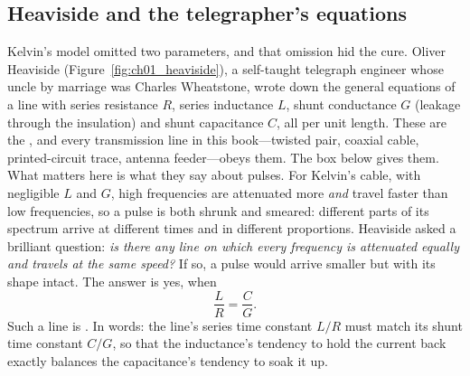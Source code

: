 \subsection{Heaviside and the telegrapher's equations}
\label{sec:ch01:heaviside}


Kelvin's model omitted two parameters, and that omission hid the cure. Oliver Heaviside
(Figure~\ref{fig:ch01_heaviside}), a self-taught telegraph engineer whose uncle by marriage was
Charles Wheatstone, wrote down the general equations of a line with series resistance $R$, series
inductance $L$, shunt conductance $G$ (leakage through the insulation) and shunt capacitance $C$, all
per unit length. These are the , and every transmission line in this
book---twisted pair, coaxial cable, printed-circuit trace, antenna feeder---obeys them.
The box below gives them. What matters here is what they say about pulses. For Kelvin's cable, with
negligible $L$ and $G$, high frequencies are attenuated more \emph{and} travel faster than low
frequencies, so a pulse is both shrunk and smeared: different parts of its spectrum arrive at
different times and in different proportions. Heaviside asked a brilliant question: \emph{is there
any line on which every frequency is attenuated equally and travels at the same speed?} If so, a
pulse would arrive smaller but with its shape intact. The answer is yes, when
\begin{equation}
\frac{L}{R} = \frac{C}{G}.
\label{eq:ch01:distortionless}
\end{equation}
Such a line is . In words: the line's series time constant $L/R$ must match its
shunt time constant $C/G$, so that the inductance's tendency to hold the current back exactly
balances the capacitance's tendency to soak it up.


